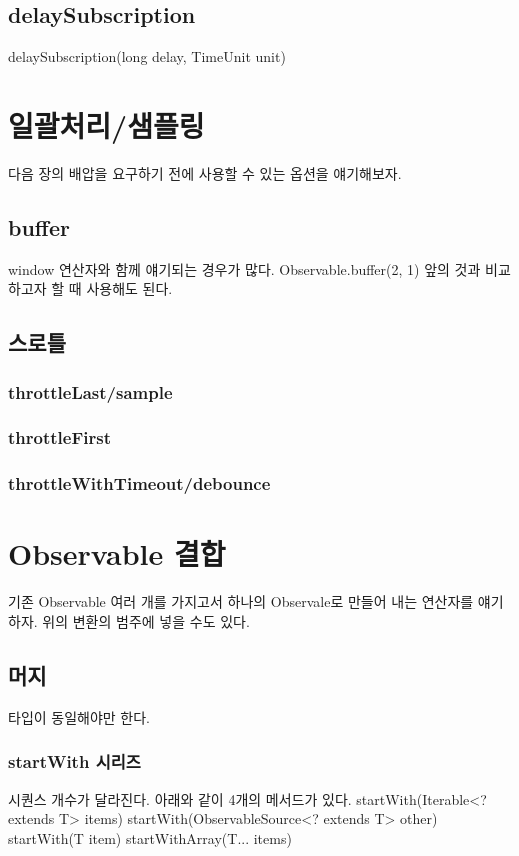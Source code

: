 \documentclass{book}
\begin{document}
{\subsection{delaySubscription}

delaySubscription(long delay, TimeUnit unit)


           
\section{일괄처리/샘플링}
다음 장의 배압을 요구하기 전에 사용할 수 있는 옵션을 얘기해보자.

\subsection{buffer}
window 연산자와 함께 얘기되는 경우가 많다.
Observable.buffer(2, 1)
앞의 것과 비교하고자 할 때 사용해도  된다.

\subsection{스로틀}
\subsubsection{throttleLast/sample}

\subsubsection{throttleFirst}

\subsubsection{throttleWithTimeout/debounce}

\section{Observable 결합}
기존 Observable 여러 개를 가지고서 하나의 Observale로 만들어 내는 연산자를 얘기하자.
위의 변환의 범주에 넣을 수도 있다.

\subsection{머지}
타입이 동일해야만 한다.
\subsubsection{startWith 시리즈}
시퀀스 개수가 달라진다. 아래와 같이 4개의 메서드가 있다. 
startWith(Iterable<? extends T> items)
startWith(ObservableSource<? extends T> other)
startWith(T item)
startWithArray(T... items) 

}
\end{document}
